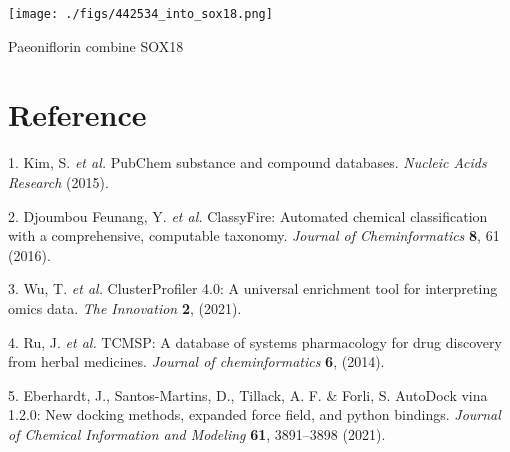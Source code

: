 \documentclass[
]{article}
\newenvironment{cslreferences}%
  {}%
  {\par}
\begin{document}
\def\@captype{figure}
\begin{center}
\texttt{[image: ./figs/442534\_into\_sox18.png]}
\caption{Paeoniflorin combine SOX18}\label{fig:Paeoniflorin-combine-SOX18}
\end{center}

\hypertarget{bibliography}{%
\section*{Reference}\label{bibliography}}

\hypertarget{refs}{}
\begin{cslreferences}
\leavevmode\hypertarget{ref-PubchemSubstanKimS2015}{}%
1. Kim, S. \emph{et al.} PubChem substance and compound databases. \emph{Nucleic Acids Research} (2015).

\leavevmode\hypertarget{ref-ClassyfireAutDjoumb2016}{}%
2. Djoumbou Feunang, Y. \emph{et al.} ClassyFire: Automated chemical classification with a comprehensive, computable taxonomy. \emph{Journal of Cheminformatics} \textbf{8}, 61 (2016).

\leavevmode\hypertarget{ref-ClusterprofilerWuTi2021}{}%
3. Wu, T. \emph{et al.} ClusterProfiler 4.0: A universal enrichment tool for interpreting omics data. \emph{The Innovation} \textbf{2}, (2021).

\leavevmode\hypertarget{ref-TcmspADatabaRuJi2014}{}%
4. Ru, J. \emph{et al.} TCMSP: A database of systems pharmacology for drug discovery from herbal medicines. \emph{Journal of cheminformatics} \textbf{6}, (2014).

\leavevmode\hypertarget{ref-AutodockVina1Eberha2021}{}%
5. Eberhardt, J., Santos-Martins, D., Tillack, A. F. \& Forli, S. AutoDock vina 1.2.0: New docking methods, expanded force field, and python bindings. \emph{Journal of Chemical Information and Modeling} \textbf{61}, 3891--3898 (2021).
\end{cslreferences}
\end{document}
